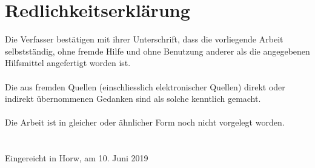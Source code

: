 \documentclass[main.tex]{subfiles}
\begin{document}
\section*{Redlichkeitserklärung}

Die Verfasser bestätigen mit ihrer Unterschrift, dass die vorliegende Arbeit selbstständig, ohne fremde Hilfe und ohne Benutzung anderer als die angegebenen Hilfsmittel angefertigt worden ist.\\
\\
Die aus fremden Quellen (einschliesslich elektronischer Quellen) direkt oder indirekt übernommenen Gedanken sind als solche kenntlich gemacht.\\
\\
Die Arbeit ist in gleicher oder ähnlicher Form noch nicht vorgelegt worden.\\
\\
\\
Eingereicht in Horw, am 10. Juni 2019\\
\\
\end{document}
